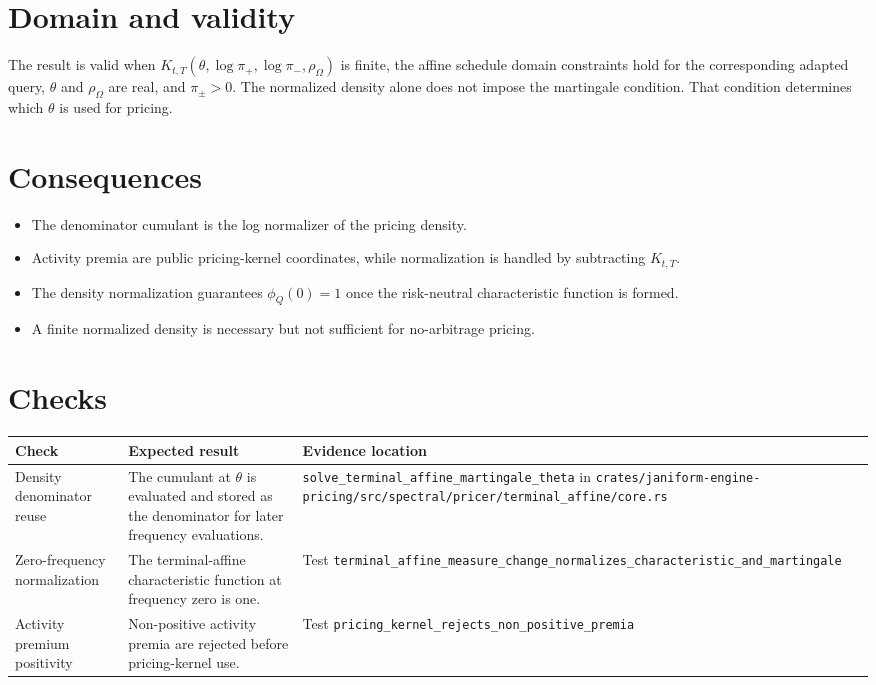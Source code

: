\documentclass[11pt]{article}
\begin{document}
\section{Domain and validity}

The result is valid when
\(K_{t,T}(\theta,\log\pi_+,\log\pi_-,\rho_\Omega)\) is finite, the affine
schedule domain constraints hold for the corresponding adapted query,
\(\theta\) and \(\rho_\Omega\) are real, and \(\pi_\pm>0\).
The normalized density alone does not impose the martingale condition.
That condition determines which \(\theta\) is used for pricing.

\section{Consequences}

\begin{itemize}
    \item The denominator cumulant is the log normalizer of the pricing density.
    \item Activity premia are public pricing-kernel coordinates, while normalization is handled by subtracting \(K_{t,T}\).
    \item The density normalization guarantees \(\phi_Q(0)=1\) once the risk-neutral characteristic function is formed.
    \item A finite normalized density is necessary but not sufficient for no-arbitrage pricing.
\end{itemize}

\section{Checks}

\begin{tabularx}{\textwidth}{XXX}
\toprule
Check & Expected result & Evidence location\\
\midrule
Density denominator reuse
& The cumulant at \(\theta\) is evaluated and stored as the denominator for later frequency evaluations.
& \texttt{solve\_terminal\_affine\_martingale\_theta} in \texttt{crates/janiform-engine-pricing/src/spectral/pricer/terminal\_affine/core.rs}\\
Zero-frequency normalization
& The terminal-affine characteristic function at frequency zero is one.
& Test \texttt{terminal\_affine\_measure\_change\_normalizes\_characteristic\_and\_martingale}\\
Activity premium positivity
& Non-positive activity premia are rejected before pricing-kernel use.
& Test \texttt{pricing\_kernel\_rejects\_non\_positive\_premia}\\
\bottomrule
\end{tabularx}
\end{document}
